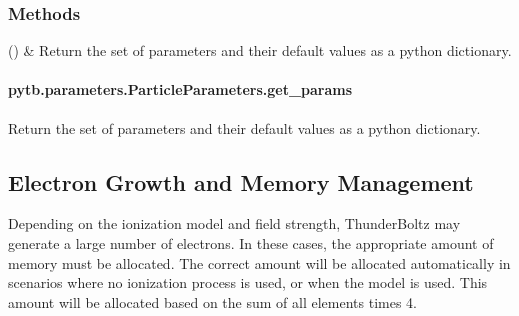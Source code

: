 \documentclass[letterpaper,10pt,english,openany,oneside]{sphinxmanual}
\begin{document}
\begin{fulllineitems}
\subsubsection*{Methods}


\begin{savenotes}\sphinxattablestart
\sphinxthistablewithglobalstyle
\sphinxthistablewithnovlinesstyle
\centering
\begin{tabulary}{\linewidth}[t]{}
\sphinxtoprule
\sphinxtableatstartofbodyhook
\sphinxAtStartPar
{\hyperref[\detokenize{api/pytb.parameters.ParticleParameters.get_params:pytb.parameters.ParticleParameters.get_params}]{}}()
&
\sphinxAtStartPar
Return the set of parameters and their default values as a python dictionary.
\\
\sphinxbottomrule
\end{tabulary}
\sphinxtableafterendhook\par
\sphinxattableend\end{savenotes}

\sphinxstepscope


\paragraph{pytb.parameters.ParticleParameters.get\_params}
\label{\detokenize{api/pytb.parameters.ParticleParameters.get_params:pytb-parameters-particleparameters-get-params}}\label{\detokenize{api/pytb.parameters.ParticleParameters.get_params::doc}}

\begin{fulllineitems}
\label{\detokenize{api/pytb.parameters.ParticleParameters.get_params:pytb.parameters.ParticleParameters.get_params}}
\pysigstartsignatures
{}
\pysigstopsignatures
\sphinxAtStartPar
Return the set of parameters and their default values
as a python dictionary.

\end{fulllineitems}


\end{fulllineitems}



\subsection{Electron Growth and Memory Management}
\label{\detokenize{params:electron-growth-and-memory-management}}\label{\detokenize{params:memory}}
\sphinxAtStartPar
Depending on the ionization model and field strength,
ThunderBoltz may generate a large number of electrons.
In these cases, the appropriate amount of memory must be
allocated. The correct amount will be allocated automatically
in scenarios where no ionization process is used,
or when the  model is used. This amount
will be allocated based on the sum of all  elements
times 4.
\end{document}
